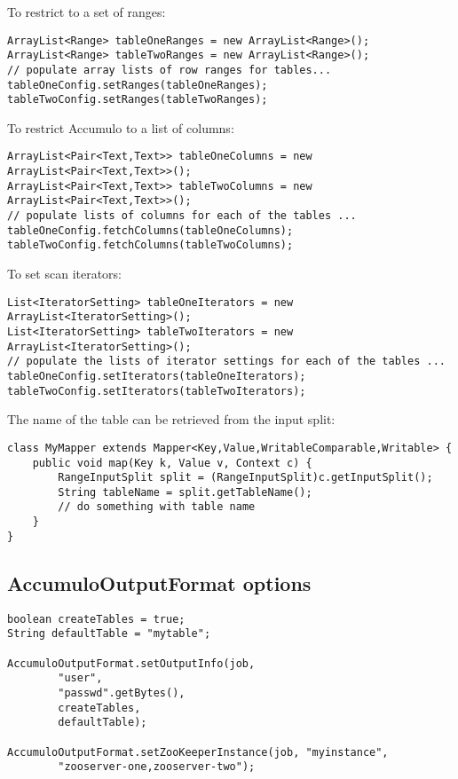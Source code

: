 To restrict to a set of ranges:

\begingroup\fontsize{8pt}{8pt}\selectfont\begin{verbatim}
ArrayList<Range> tableOneRanges = new ArrayList<Range>();
ArrayList<Range> tableTwoRanges = new ArrayList<Range>();
// populate array lists of row ranges for tables...
tableOneConfig.setRanges(tableOneRanges);
tableTwoConfig.setRanges(tableTwoRanges);
\end{verbatim}\endgroup

To restrict Accumulo to a list of columns:

\begingroup\fontsize{8pt}{8pt}\selectfont\begin{verbatim}
ArrayList<Pair<Text,Text>> tableOneColumns = new ArrayList<Pair<Text,Text>>();
ArrayList<Pair<Text,Text>> tableTwoColumns = new ArrayList<Pair<Text,Text>>();
// populate lists of columns for each of the tables ...
tableOneConfig.fetchColumns(tableOneColumns);
tableTwoConfig.fetchColumns(tableTwoColumns);
\end{verbatim}\endgroup

To set scan iterators:

\begingroup\fontsize{8pt}{8pt}\selectfont\begin{verbatim}
List<IteratorSetting> tableOneIterators = new ArrayList<IteratorSetting>();
List<IteratorSetting> tableTwoIterators = new ArrayList<IteratorSetting>();
// populate the lists of iterator settings for each of the tables ...
tableOneConfig.setIterators(tableOneIterators);
tableTwoConfig.setIterators(tableTwoIterators);
\end{verbatim}\endgroup


The name of the table can be retrieved from the input split:

\begingroup\fontsize{8pt}{8pt}\selectfont\begin{verbatim}
class MyMapper extends Mapper<Key,Value,WritableComparable,Writable> {
    public void map(Key k, Value v, Context c) {
        RangeInputSplit split = (RangeInputSplit)c.getInputSplit();
        String tableName = split.getTableName();
        // do something with table name 
    }
}
\end{verbatim}\endgroup


\subsection{AccumuloOutputFormat options}

\begingroup\fontsize{8pt}{8pt}\selectfont\begin{verbatim}
boolean createTables = true;
String defaultTable = "mytable";

AccumuloOutputFormat.setOutputInfo(job,
        "user",
        "passwd".getBytes(),
        createTables,
        defaultTable);

AccumuloOutputFormat.setZooKeeperInstance(job, "myinstance",
        "zooserver-one,zooserver-two");
\end{verbatim}\endgroup


